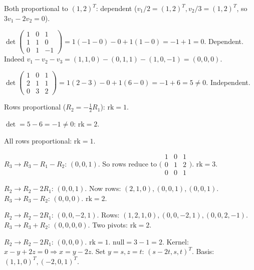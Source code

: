 \begin{solutions}
    \item Both proportional to $(1, 2)^{T}$: dependent ($v_{1}/2 = (1, 2)^{T}, v_{2}/3 = (1, 2)^{T}$, so $3 v_{1} - 2 v_{2} = 0$).

    \item $\det\begin{pmatrix} 1 & 0 & 1 \\ 1 & 1 & 0 \\ 0 & 1 & -1 \end{pmatrix} = 1(-1 - 0) - 0 + 1(1 - 0) = -1 + 1 = 0$. Dependent. Indeed $v_{1} - v_{2} - v_{3} = (1, 1, 0) - (0, 1, 1) - (1, 0, -1) = (0, 0, 0)$.

    \item $\det\begin{pmatrix} 1 & 0 & 1 \\ 2 & 1 & 1 \\ 0 & 3 & 2 \end{pmatrix} = 1(2 - 3) - 0 + 1(6 - 0) = -1 + 6 = 5 \neq 0$. Independent.

    \item Rows proportional ($R_{2} = -\tfrac{1}{2} R_{1}$): $\mathrm{rk} = 1$.

    \item $\det = 5 - 6 = -1 \neq 0$: $\mathrm{rk} = 2$.

    \item All rows proportional: $\mathrm{rk} = 1$.

    \item $R_{3} \to R_{3} - R_{1} - R_{2}$: $(0, 0, 1)$. So rows reduce to $\bigl(\begin{smallmatrix} 1 & 0 & 1 \\ 0 & 1 & 2 \\ 0 & 0 & 1 \end{smallmatrix}\bigr)$. $\mathrm{rk} = 3$.

    \item $R_{2} \to R_{2} - 2 R_{1}$: $(0, 0, 1)$. Now rows: $(2, 1, 0), (0, 0, 1), (0, 0, 1)$. $R_{3} \to R_{3} - R_{2}$: $(0, 0, 0)$. $\mathrm{rk} = 2$.

    \item $R_{2} \to R_{2} - 2 R_{1}$: $(0, 0, -2, 1)$. Rows: $(1, 2, 1, 0), (0, 0, -2, 1), (0, 0, 2, -1)$. $R_{3} \to R_{3} + R_{2}$: $(0, 0, 0, 0)$. Two pivots: $\mathrm{rk} = 2$.

    \item $R_{2} \to R_{2} - 2 R_{1}$: $(0, 0, 0)$. $\mathrm{rk} = 1$. $\mathrm{null} = 3 - 1 = 2$. Kernel: $x - y + 2 z = 0 \Rightarrow x = y - 2 z$. Set $y = s, z = t$: $(s - 2 t, s, t)^{T}$. Basis: $(1, 1, 0)^{T}, (-2, 0, 1)^{T}$.


\end{solutions}
